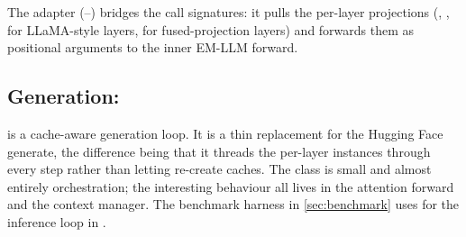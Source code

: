 The  adapter (--) bridges the call signatures: it pulls the per-layer projections (, ,  for LLaMA-style layers,  for fused-projection layers) and forwards them as positional arguments to the inner EM-LLM forward.

\subsection{Generation: }
\label{sec:walkthrough-greedy-search}

 is a cache-aware generation loop. It is a thin replacement for the Hugging Face generate, the difference being that it threads the per-layer  instances through every step rather than letting  re-create caches. The class is small and almost entirely orchestration; the interesting behaviour all lives in the attention forward and the context manager. The benchmark harness in \cref{sec:benchmark} uses  for the inference loop in .
